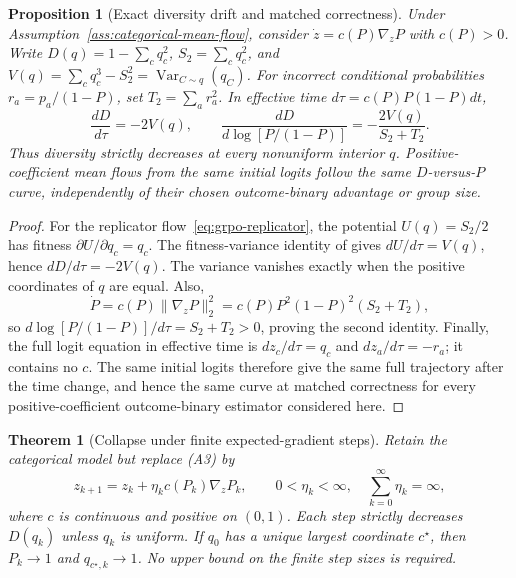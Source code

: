 \documentclass{article}
\newcommand{\enforcehalffinalproseline}{%
  \setlength{\parfillskip}{0pt plus .20\linewidth}}
\newcommand{\1}{\mathbf 1}
\newtheorem{theorem}[lemma]{Theorem}
\newtheorem{proposition}[lemma]{Proposition}
\theoremstyle{remark}
\theoremstyle{definition}
\theoremstyle{plain}
\begin{document}
\begin{proposition}[Exact diversity drift and matched correctness]
\enforcehalffinalproseline
\label{prop:pcmd-drift}
Under Assumption~\ref{ass:categorical-mean-flow}, consider
$\dot z=c(P)\nabla_zP$ with $c(P)>0$. Write
$D(q)=1-\sum_cq_c^2$, $S_2=\sum_cq_c^2$, and
$V(q)=\sum_cq_c^3-S_2^2=\operatorname{Var}_{C\sim q}(q_C)$.
For incorrect conditional probabilities $r_a=p_a/(1-P)$, set
$T_2=\sum_ar_a^2$. In effective time $d\tau=c(P)P(1-P)dt$,
\begin{equation}
 \frac{dD}{d\tau}=-2V(q),
 \qquad
 \frac{dD}{d\log[P/(1-P)]}
 =-\frac{2V(q)}{S_2+T_2}.
 \label{eq:pcmd-drift}
\end{equation}
Thus diversity strictly decreases at every nonuniform interior $q$.
Positive-coefficient mean flows from the same initial logits follow the same
$D$-versus-$P$ curve, independently of their chosen outcome-binary advantage or
group size.
\end{proposition}

\begin{proof}
\enforcehalffinalproseline
For the replicator flow~\eqref{eq:grpo-replicator}, the potential
$U(q)=S_2/2$ has fitness $\partial U/\partial q_c=q_c$.
The fitness-variance identity of
\citet[Theorems~1--2]{harper2009informationgeometry} gives
$dU/d\tau=V(q)$, hence $dD/d\tau=-2V(q)$.
The variance vanishes exactly when the
positive coordinates of $q$ are equal. Also,
\[
 \dot P=c(P)\|\nabla_zP\|_2^2
       =c(P)P^2(1-P)^2(S_2+T_2),
\]
so $d\log[P/(1-P)]/d\tau=S_2+T_2>0$, proving the second identity.
Finally, the full logit equation in effective time is
$dz_c/d\tau=q_c$ and $dz_a/d\tau=-r_a$; it contains no $c$.
The same initial logits therefore give the same full trajectory after the
time change, and hence the same curve at matched correctness for every positive-coefficient outcome-binary estimator considered here.
\end{proof}

\begin{theorem}[Collapse under finite expected-gradient steps]
\enforcehalffinalproseline
\label{thm:finite-expected-steps}
Retain the categorical model but replace (A3) by
\begin{equation}
 z_{k+1}=z_k+\eta_k c(P_k)\nabla_zP_k,
 \qquad 0<\eta_k<\infty,\quad \sum_{k=0}^\infty\eta_k=\infty,
 \label{eq:finite-expected-update}
\end{equation}
where $c$ is continuous and positive on $(0,1)$. Each step strictly decreases
$D(q_k)$ unless $q_k$ is uniform. If $q_0$ has a unique largest coordinate
$c^\star$, then $P_k\to1$ and $q_{c^\star,k}\to1$.
No upper bound on the finite step sizes is required.
\end{theorem}
\end{document}
